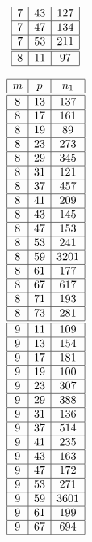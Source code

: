\documentclass[a4paper, 10pt]{article}
\begin{document}
\begin{center}
\begin{minipage}[t]{.23\textwidth}
\begin{displaymath}
\begin{array}{|c|c|c|}
7 & 43 & 127 \\ \hline
7 & 47 & 134 \\ \hline
7 & 53 & 211 \\ \hline
\hline
8 & 11 & 97 \\ \hline
\end{array}
\end{displaymath}
\end{minipage}
\begin{minipage}[t]{.23\textwidth}
\begin{displaymath}
\begin{array}{|c|c|c|}
\hline
m & p & n_{1} \\ \hline
\hline
8 & 13 & 137 \\ \hline
8 & 17 & 161 \\ \hline
8 & 19 & 89 \\ \hline
8 & 23 & 273 \\ \hline
8 & 29 & 345 \\ \hline
8 & 31 & 121 \\ \hline
8 & 37 & 457 \\ \hline
8 & 41 & 209 \\ \hline
8 & 43 & 145 \\ \hline
8 & 47 & 153 \\ \hline
8 & 53 & 241 \\ \hline
8 & 59 & 3201 \\ \hline
8 & 61 & 177 \\ \hline
8 & 67 & 617 \\ \hline
8 & 71 & 193 \\ \hline
8 & 73 & 281 \\ \hline
\hline
9 & 11 & 109 \\ \hline
9 & 13 & 154 \\ \hline
9 & 17 & 181 \\ \hline
9 & 19 & 100 \\ \hline
9 & 23 & 307 \\ \hline
9 & 29 & 388 \\ \hline
9 & 31 & 136 \\ \hline
9 & 37 & 514 \\ \hline
9 & 41 & 235 \\ \hline
9 & 43 & 163 \\ \hline
9 & 47 & 172 \\ \hline
9 & 53 & 271 \\ \hline
9 & 59 & 3601 \\ \hline
9 & 61 & 199 \\ \hline
9 & 67 & 694 \\ \hline

\end{array}
\end{displaymath}
\end{minipage}
\end{center}
\end{document}
